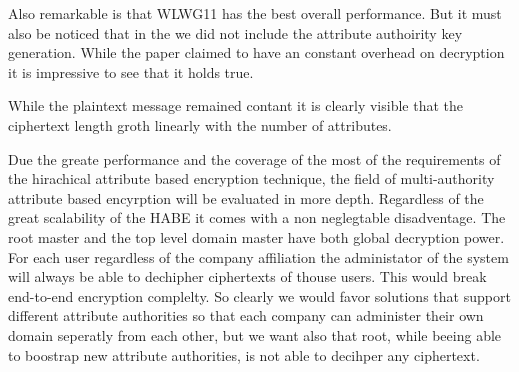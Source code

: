 Also remarkable is that WLWG11 has the best overall performance. But it must also be noticed that in the we did not include the attribute authoirity key generation. While the paper claimed to have an constant overhead on decryption it is impressive to see that it holds true. 

While the plaintext message remained contant it is clearly visible that the ciphertext length groth linearly with the number of attributes. 

Due the greate performance and the coverage of the most of the requirements of the hirachical attribute based encryption technique, the field of multi-authority attribute based encyrption will be evaluated in more depth. Regardless of the great scalability of the HABE it comes with a non neglegtable disadventage. The root master and the top level domain master have both global decryption power. For each user regardless of the company affiliation the administator of the system will always be able to dechipher ciphertexts of thouse users. This would break end-to-end encryption complelty. So clearly we would favor solutions that support different attribute authorities so that each company can administer their own domain seperatly from each other, but we want also that root, while beeing able to boostrap new attribute authorities, is not able to decihper any ciphertext. 


